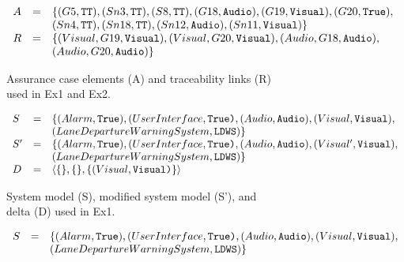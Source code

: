 \begin{figure*}[t]
\begin{framed}
\begin{subfigure}[c]{\textwidth}
	\vspace{-0.2in}
	\small
	\centering
	\[
	\begin{array}{lcl}
	A & = & \{ (G5, \texttt{TT}), (Sn3, \texttt{TT}), (S8, \texttt{TT}), (G18, \texttt{Audio}), (G19, \texttt{Visual}), 
	(G20, \texttt{\text{True}}), \\
	  &   &   (Sn4, \texttt{TT}), (Sn18, \texttt{TT}), (Sn12, \texttt{Audio}), (Sn11, \texttt{Visual}) \} \\
	
	R & = & \{ (Visual, G19, \texttt{Visual}), (Visual, G20, \texttt{Visual}), (Audio, G18, \texttt{Audio}), \\
	  &   &   (Audio, G20, \texttt{Audio}) \}
	\end{array}
	\]
	\vspace{-0.2in}
	\caption{Assurance case elements (A) and traceability links (R) used in Ex1 and Ex2.}
	\label{fig:common}
\end{subfigure}

\vfill

\begin{subfigure}[c]{\textwidth}
	\small
	\centering
	\[
	\begin{array}{lcl}
	S & = & \{ (Alarm, \texttt{\text{True}}), (UserInterface, \texttt{\text{True})}, (Audio, \texttt{Audio}), (Visual, \texttt{Visual}), \\
	  &   &     (LaneDepartureWarningSystem, \texttt{LDWS}) \} \\

	S' & = & \{ (Alarm, \texttt{\text{True}}), (UserInterface, \texttt{\text{True})}, (Audio, \texttt{Audio}), (Visual', \texttt{Visual}), \\ 
	   &   &    (LaneDepartureWarningSystem, \texttt{LDWS})\} \\

	D & = & \langle \{\}, \{\}, \{(Visual, \texttt{Visual)}\} \rangle
	\end{array}
	\]
	\vspace{-0.2in}
	\caption{System model (S), modified system model (S'), and delta (D) used in Ex1.}
	\label{fig:example1}
\end{subfigure}

\vfill

\begin{subfigure}[c]{\textwidth}
	\small
	\centering
	\[
	\begin{array}{lcl}
	S & = & \{ (Alarm, \texttt{\text{True}}), (UserInterface, \texttt{\text{True})}, (Audio, \texttt{Audio}), (Visual, \texttt{Visual}), \\
	  &   &    (LaneDepartureWarningSystem, \texttt{LDWS})\} \\
	

\end{array}\]
\end{subfigure}
\end{framed}
\end{figure*}
